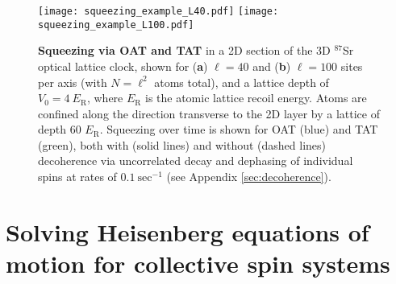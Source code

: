 \documentclass[aps,prx,superscriptaddress,notitlepage,twocolumn,longbibliography]{revtex4-2}
\renewcommand{\t}{\text} %
\begin{document}
\begin{figure*}
\centering
\texttt{[image: squeezing\_example\_L40.pdf]}
\texttt{[image: squeezing\_example\_L100.pdf]}
\caption{{\bf Squeezing via OAT and TAT} in a 2D section of the 3D $^{87}$Sr optical lattice clock, shown for ({\bf a}) $\ell=40$ and ({\bf b}) $\ell=100$ sites per axis (with $N=\ell^2$ atoms total), and a lattice depth of $V_0=4~E_{\t{R}}$, where $E_{\t{R}}$ is the atomic lattice recoil energy.
Atoms are confined along the direction transverse to the 2D layer by a lattice of depth 60 $E_{\t{R}}$.
Squeezing over time is shown for OAT (blue) and TAT (green), both with (solid lines) and without (dashed lines) decoherence via uncorrelated decay and dephasing of individual spins at rates of $0.1~\t{sec}^{-1}$ (see Appendix \ref{sec:decoherence}).
}
\label{fig:squeezing_example}
\end{figure*}

\section{Solving Heisenberg equations of motion for collective spin systems}
\label{sec:collective_simulation}
\end{document}
